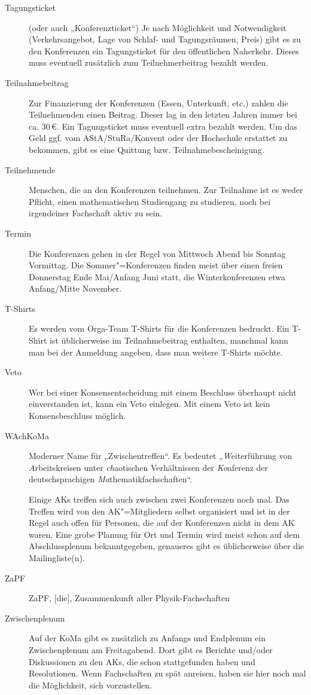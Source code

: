 \begin{description}
\item[Tagungsticket]
    (oder auch „Konferenzticket“) Je nach Möglichkeit und Notwendigkeit (Verkehrsangebot, Lage von Schlaf- und Tagungsräumen, Preis) gibt es zu den Konferenzen ein Tagungsticket für den öffentlichen Naherkehr. Dieses muss eventuell zusätzlich zum Teilnehmerbeitrag bezahlt werden.

\item[Teilnahmebeitrag]
    Zur Finanzierung der Konferenzen (Essen, Unterkunft, etc.) zahlen die Teilnehmenden einen Beitrag. Dieser lag in den letzten Jahren immer bei ca. 30\,€. Ein Tagungsticket muss eventuell extra bezahlt werden. Um das Geld ggf. vom AStA/StuRa/Konvent oder der Hochschule erstattet zu bekommen, gibt es eine Quittung bzw. Teilnahmebescheinigung.

\item[Teilnehmende]
    Menschen, die an den Konferenzen teilnehmen. Zur Teilnahme ist es weder Pflicht, einen mathematischen Studiengang zu studieren, noch bei irgendeiner Fachschaft aktiv zu sein.

\item[Termin]
    Die Konferenzen gehen in der Regel von Mittwoch Abend bis Sonntag Vormittag. Die Sommer"=Konferenzen finden meist über einen freien Donnerstag Ende Mai/Anfang Juni statt, die Winterkonferenzen etwa Anfang/Mitte November.

\item[T-Shirts]
    Es werden vom Orga-Team T-Shirts für die Konferenzen bedruckt. Ein T-Shirt ist üblicherweise im Teilnahmebeitrag enthalten, manchmal kann man bei der Anmeldung angeben, dass man weitere T-Shirts möchte.

\item[Veto]
    Wer bei einer Konsensentscheidung mit einem Beschluss überhaupt nicht einverstanden ist, kann ein Veto einlegen. Mit einem Veto ist kein Konsensbeschluss möglich.

\item[WAchKoMa]
    Moderner Name für „Zwischentreffen“. Es bedeutet „\emph{W}ei\-ter\-füh\-rung	von \emph{A}rbeitskreisen unter \emph{ch}aotischen Verhältnissen der \emph{Ko}nferenz der deutschsprachigen \emph{Ma}thematikfachschaften“.
    
    Einige AKs treffen sich auch zwischen zwei Konferenzen noch mal. Das Treffen wird von den AK"=Mitgliedern selbst organisiert und ist in der Regel auch offen für Personen, die auf der Konferenzen nicht in dem AK waren.  Eine grobe Planung für Ort und Termin wird meist schon auf dem Abschlussplenum bekanntgegeben, genaueres gibt es üblicherweise über die Mailingliste(n).

\item[ZaPF]
    ZaPF, [die], Zusammenkunft aller Physik-Fachschaften

\item[Zwischenplenum]
    Auf der KoMa gibt es zusätzlich zu Anfangs und Endplenum ein Zwischenplenum am Freitagabend.  Dort gibt es Berichte und/oder Diskussionen zu den AKs, die schon stattgefunden haben und Resolutionen. Wenn Fachschaften zu spät anreisen, haben sie hier noch mal die Möglichkeit, sich vorzustellen.
\end{description}
